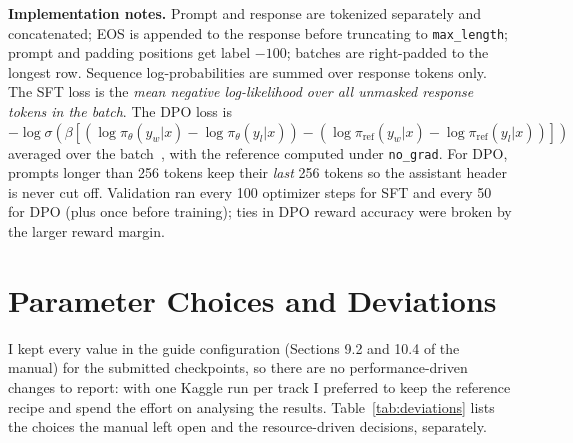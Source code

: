 \documentclass[10pt]{article}
\begin{document}
\textbf{Implementation notes.} Prompt and response are tokenized separately and concatenated; EOS is appended to the response before truncating to \texttt{max\_length}; prompt and padding positions get label $-100$; batches are right-padded to the longest row. Sequence log-probabilities are summed over response tokens only. The SFT loss is the \emph{mean negative log-likelihood over all unmasked response tokens in the batch}. The DPO loss is $-\log\sigma(\beta[(\log\pi_\theta(y_w|x)-\log\pi_\theta(y_l|x))-(\log\pi_\text{ref}(y_w|x)-\log\pi_\text{ref}(y_l|x))])$ averaged over the batch~\cite{rafailov2023}, with the reference computed under \texttt{no\_grad}. For DPO, prompts longer than 256 tokens keep their \emph{last} 256 tokens so the assistant header is never cut off. Validation ran every 100 optimizer steps for SFT and every 50 for DPO (plus once before training); ties in DPO reward accuracy were broken by the larger reward margin.

\section{Parameter Choices and Deviations}

I kept every value in the guide configuration (Sections 9.2 and 10.4 of the manual) for the submitted checkpoints, so there are no performance-driven changes to report: with one Kaggle run per track I preferred to keep the reference recipe and spend the effort on analysing the results. Table~\ref{tab:deviations} lists the choices the manual left open and the resource-driven decisions, separately.
\end{document}
